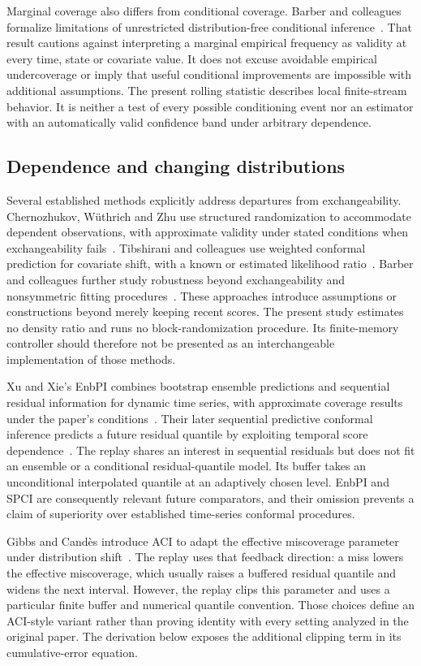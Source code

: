 Marginal coverage also differs from conditional coverage. Barber and colleagues formalize limitations of unrestricted distribution-free conditional inference~\cite{limits2021}. That result cautions against interpreting a marginal empirical frequency as validity at every time, state or covariate value. It does not excuse avoidable empirical undercoverage or imply that useful conditional improvements are impossible with additional assumptions. The present rolling statistic describes local finite-stream behavior. It is neither a test of every possible conditioning event nor an estimator with an automatically valid confidence band under arbitrary dependence.

\subsection{Dependence and changing distributions}
Several established methods explicitly address departures from exchangeability. Chernozhukov, W\"uthrich and Zhu use structured randomization to accommodate dependent observations, with approximate validity under stated conditions when exchangeability fails~\cite{dependent2018}. Tibshirani and colleagues use weighted conformal prediction for covariate shift, with a known or estimated likelihood ratio~\cite{weighted2019}. Barber and colleagues further study robustness beyond exchangeability and nonsymmetric fitting procedures~\cite{beyond2023}. These approaches introduce assumptions or constructions beyond merely keeping recent scores. The present study estimates no density ratio and runs no block-randomization procedure. Its finite-memory controller should therefore not be presented as an interchangeable implementation of those methods.

Xu and Xie's EnbPI combines bootstrap ensemble predictions and sequential residual information for dynamic time series, with approximate coverage results under the paper's conditions~\cite{enbpi2021}. Their later sequential predictive conformal inference predicts a future residual quantile by exploiting temporal score dependence~\cite{spci2023}. The replay shares an interest in sequential residuals but does not fit an ensemble or a conditional residual-quantile model. Its buffer takes an unconditional interpolated quantile at an adaptively chosen level. EnbPI and SPCI are consequently relevant future comparators, and their omission prevents a claim of superiority over established time-series conformal procedures.

Gibbs and Cand\`es introduce ACI to adapt the effective miscoverage parameter under distribution shift~\cite{gibbs2021}. The replay uses that feedback direction: a miss lowers the effective miscoverage, which usually raises a buffered residual quantile and widens the next interval. However, the replay clips this parameter and uses a particular finite buffer and numerical quantile convention. Those choices define an ACI-style variant rather than proving identity with every setting analyzed in the original paper. The derivation below exposes the additional clipping term in its cumulative-error equation.

